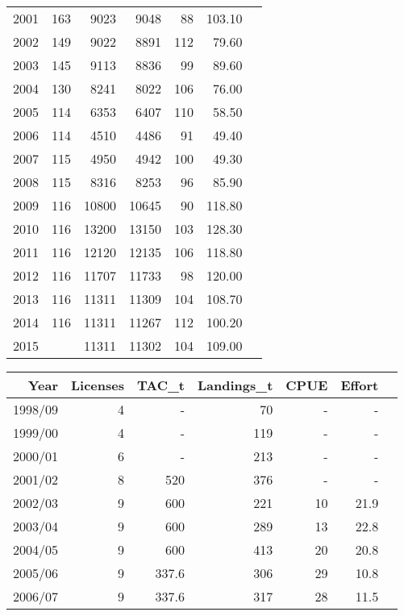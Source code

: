 \documentclass[paper=a4, fontsize=11pt]{article}
\begin{document}
\begin{table}[h]
\begin{tabular}{rrrrrrr}
2001 & 163 & 9023 & 9048 &  88 & 103.10 \\ 
2002 & 149 & 9022 & 8891 & 112 & 79.60 \\ 
2003 & 145 & 9113 & 8836 &  99 & 89.60 \\ 
2004 & 130 & 8241 & 8022 & 106 & 76.00 \\ 
2005 & 114 & 6353 & 6407 & 110 & 58.50 \\ 
2006 & 114 & 4510 & 4486 &  91 & 49.40 \\ 
2007 & 115 & 4950 & 4942 & 100 & 49.30 \\ 
2008 & 115 & 8316 & 8253 &  96 & 85.90 \\ 
2009 & 116 & 10800 & 10645 &  90 & 118.80 \\ 
2010 & 116 & 13200 & 13150 & 103 & 128.30 \\ 
2011 & 116 & 12120 & 12135 & 106 & 118.80 \\ 
2012 & 116 & 11707 & 11733 &  98 & 120.00 \\ 
2013 & 116 & 11311 & 11309 & 104 & 108.70 \\ 
2014 & 116 & 11311 & 11267 & 112 & 100.20 \\ 
2015 &  & 11311 & 11302 & 104 & 109.00 \\ 
   \hline
\end{tabular}
\newline
\vspace*{1cm}
\begin{center}
\begin{tabular}{rrrrrrr}
  \hline
Year & Licenses & TAC\_t & Landings\_t & CPUE & Effort \\ 
  \hline
1998/09 &   4 & - &  70 & - & - \\ 
1999/00 &   4 & - & 119 & - & - \\ 
2000/01 &   6 & - & 213 & - & - \\ 
2001/02 &   8 & 520 & 376 & - & - \\ 
2002/03 &   9 & 600 & 221 & 10 & 21.9 \\ 
2003/04 &   9 & 600 & 289 & 13 & 22.8 \\ 
2004/05 &   9 & 600 & 413 & 20 & 20.8 \\ 
2005/06 &   9 & 337.6 & 306 & 29 & 10.8 \\ 
2006/07 &   9 & 337.6 & 317 & 28 & 11.5 \\ 

\end{tabular}
\end{center}
\end{table}
\end{document}
